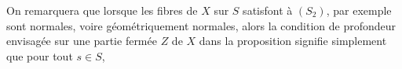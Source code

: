 On remarquera que lorsque  les fibres de $X$ sur $S$ satisfont à $(S_2)$,
par exemple sont normales, voire géométriquement  normales, alors la
condition de profondeur  envisagée sur  une partie fermée $Z$ de $X$ dans 
la proposition  signifie simplement que pour tout $s \in S$,

